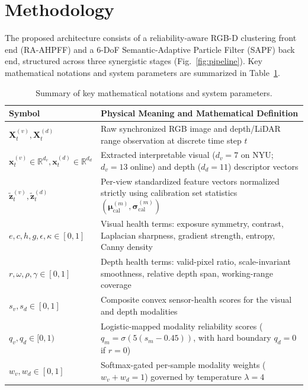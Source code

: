 \documentclass[11pt, a4paper]{article}
\begin{document}
\section{Methodology}
\label{sec:methodology}

The proposed architecture consists of a reliability-aware RGB-D clustering front end (RA-AHPFF) and a 6-DoF Semantic-Adaptive Particle Filter (SAPF) back end, structured across three synergistic stages (Fig.~\ref{fig:pipeline}). Key mathematical notations and system parameters are summarized in Table~\ref{tab:nomenclature}.

\begin{table}[htbp]
    \centering
    \caption{Summary of key mathematical notations and system parameters.}
    \label{tab:nomenclature}
    \footnotesize
    \setlength{\tabcolsep}{5pt}
    \begin{tabularx}{\textwidth}{l X}
        \toprule
        \textbf{Symbol} & \textbf{Physical Meaning and Mathematical Definition} \\
        \midrule
        $\mathbf{X}_t^{(v)}, \mathbf{X}_t^{(d)}$ & Raw synchronized RGB image and depth/LiDAR range observation at discrete time step $t$ \\
        $\mathbf{x}_t^{(v)} \in \mathbb{R}^{d_v}, \mathbf{x}_t^{(d)} \in \mathbb{R}^{d_d}$ & Extracted interpretable visual ($d_v = 7$ on NYU; $d_v = 13$ online) and depth ($d_d = 11$) descriptor vectors \\
        $\tilde{\mathbf{z}}_t^{(v)}, \tilde{\mathbf{z}}_t^{(d)}$ & Per-view standardized feature vectors normalized strictly using calibration set statistics $(\bm{\mu}_{\text{cal}}^{(m)}, \bm{\sigma}_{\text{cal}}^{(m)})$ \\
        $e, c, h, g, \epsilon, \kappa \in [0,1]$ & Visual health terms: exposure symmetry, contrast, Laplacian sharpness, gradient strength, entropy, Canny density \\
        $r, \omega, \rho, \gamma \in [0,1]$ & Depth health terms: valid-pixel ratio, scale-invariant smoothness, relative depth span, working-range coverage \\
        $s_v, s_d \in [0,1]$ & Composite convex sensor-health scores for the visual and depth modalities \\
        $q_v, q_d \in [0,1)$ & Logistic-mapped modality reliability scores ($q_m = \sigma(5(s_m - 0.45))$, with hard boundary $q_d = 0$ if $r = 0$) \\
        $w_v, w_d \in [0,1]$ & Softmax-gated per-sample modality weights ($w_v + w_d = 1$) governed by temperature $\lambda = 4$ \\

\end{tabularx}
\end{table}
\end{document}
